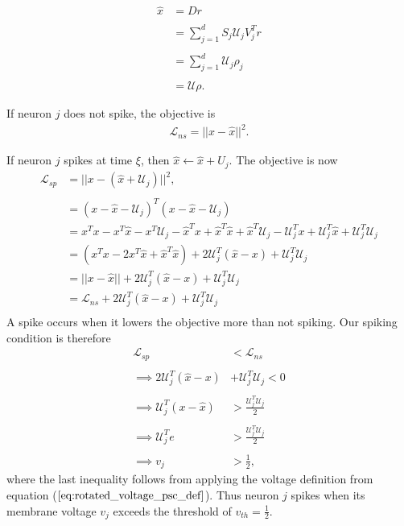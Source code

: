 \begin{enumerate}
\begin{align*}
    \hat{x} &= D r 
    \\
    \\
    &=
    \sum_{j=1}^d S_j \mathcal{U}_j V_j^T r
    \\
    \\
    &= 
    \sum_{j=1}^d \mathcal{U}_j \rho_j
    \\
    \\
    &=
    \mathcal{U} \rho. 
\end{align*}

If neuron $j$ does not spike, the objective is
\begin{align*}
    \mathcal{L}_{ns} = ||x - \hat{x}||^2.
\end{align*}
 
If neuron $j$ spikes at time $\xi$, then $\hat{x} \leftarrow \hat{x} + \hat{U}_j$. The objective is now
\begin{align*}
    \mathcal{L}_{sp} &= || x - (\hat{x} + \mathcal{U}_j) ||^2,\\
    \\
    &= 
    (x-\hat{x}-\mathcal{U}_j)^T (x-\hat{x}-\mathcal{U}_j)\\
    &= 
    x^T x - x^T \hat{x} - x^T \mathcal{U}_j
    - \hat{x}^T x +\hat{x}^T\hat{x} +\hat{x}^T \mathcal{U}_j
    -
    \mathcal{U}_j^T x + \mathcal{U}_j^T \hat{x} + \mathcal{U}_j^T \mathcal{U}_j
    \\
    &=
    \left(x^T x -2 x^T \hat{x} +\hat{x}^T\hat{x}  \right) + 
    2 \mathcal{U}_j^T \left( \hat{x} - x
    \right) + \mathcal{U}_j^T \mathcal{U}_j\\
    &= 
    ||x -\hat{x}|| +  2 \mathcal{U}_j^T \left( \hat{x} - x
    \right) + \mathcal{U}_j^T \mathcal{U}_j\\
    &= 
    \mathcal{L}_{ns} + 2 \mathcal{U}_j^T \left( \hat{x} - x
    \right) + \mathcal{U}_j^T \mathcal{U}_j\\
\end{align*}
 A spike occurs when it lowers the objective more than not spiking. Our spiking condition is therefore
\begin{align*}
    \mathcal{L}_{sp} &< \mathcal{L}_{ns}\\
    \\
    \implies
     2 \mathcal{U}_j^T \left( \hat{x} - x
    \right) &+ \mathcal{U}_j^T \mathcal{U}_j < 0\\
    \\
    \implies 
    \mathcal{U}_j^T \left(x -\hat{x} \right) &> \frac{\mathcal{U}_j ^T \mathcal{U}_j}{2}\\
    \\
    \implies
    \mathcal{U}_j^T e &> \frac{\mathcal{U}_j^T \mathcal{U}_j}{2}
    \\
    \\
    \implies
    v_j &> \frac{1}{2},
\end{align*}
where the last inequality follows from applying the voltage definition from equation ($\ref{eq:rotated_voltage_psc_def}$). Thus neuron $j$ spikes when its membrane voltage $v_j$ exceeds the threshold of $v_{th} = \frac{1}{2}$. 


\end{enumerate}
